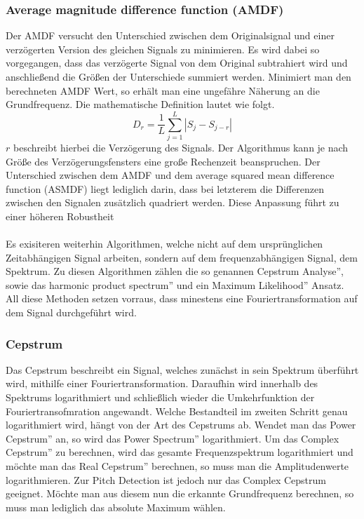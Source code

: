 \subsubsection*{Average magnitude difference function (AMDF)}
Der AMDF versucht den Unterschied zwischen dem Originalsignal und einer verzögerten Version des gleichen Signals zu minimieren. Es wird dabei so vorgegangen, dass das verzögerte Signal von dem Original subtrahiert wird und anschließend die Größen der Unterschiede summiert werden. Minimiert man den berechneten AMDF Wert, so erhält man eine ungefähre Näherung an die Grundfrequenz. \cite{ross1974average} Die mathematische Definition lautet wie folgt.
$$ D_r = \frac{1}{L} \sum_{j=1}^L |S_j - S_{j-r}| $$
$r$ beschreibt hierbei die Verzögerung des Signals. Der Algorithmus kann je nach Größe des Verzögerungsfensters eine große Rechenzeit beanspruchen. Der Unterschied zwischen dem AMDF und dem average squared mean difference function (ASMDF) liegt lediglich darin, dass bei letzterem die Differenzen zwischen den Signalen zusätzlich quadriert werden. Diese Anpassung führt zu einer höheren Robustheit
\\\\

Es exisiteren weiterhin Algorithmen, welche nicht auf dem ursprünglichen Zeitabhängigen Signal arbeiten, sondern auf dem frequenzabhängigen Signal, dem Spektrum. Zu diesen Algorithmen zählen die so genannen \glqq Cepstrum Analyse'', sowie das \glqq harmonic product spectrum'' und ein \glqq Maximum Likelihood'' Ansatz. All diese Methoden setzen vorraus, dass minestens eine Fouriertransformation auf dem Signal durchgeführt wird.

\subsubsection*{Cepstrum}
Das Cepstrum beschreibt ein Signal, welches zunächst in sein Spektrum überführt wird, mithilfe einer Fouriertransformation. Daraufhin wird innerhalb des Spektrums logarithmiert und schließlich wieder die Umkehrfunktion der Fouriertransofmration angewandt. Welche Bestandteil im zweiten Schritt genau logarithmiert wird, hängt von der Art des Cepstrums ab. Wendet man das \glqq Power Cepstrum'' an, so wird das \glqq Power Spectrum'' logarithmiert. Um das \glqq Complex Cepstrum'' zu berechnen, wird das gesamte Frequenzspektrum logarithmiert und möchte man das \glqq Real Cepstrum'' berechnen, so muss man die Amplitudenwerte logarithmieren.  \cite{oppenheim2004frequency} Zur Pitch Detection ist jedoch nur das Complex Cepstrum geeignet. Möchte man aus diesem nun die erkannte Grundfrequenz berechnen, so muss man lediglich das absolute Maximum wählen. 

